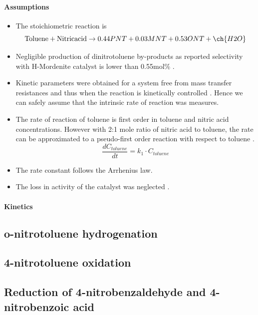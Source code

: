 \paragraph{Assumptions}
\begin{itemize}
    \item The stoichiometric reaction is 
    \begin{equation}
        \mathrm{Toluene} +  \mathrm{Nitric}  \mathrm{acid} \rightarrow 0.44PNT + 0.03 MNT + 0.53 ONT + \ch{H2O}
    \end{equation}
    \item Negligible production of dinitrotoluene by-products as reported selectivity with H-Mordenite catalyst is lower than 0.55mol\% \cite{jeeru_kinetics_2018}.
    \item Kinetic parameters were obtained for a system free from mass transfer resistances and thus when the reaction is kinetically controlled \cite{jeeru_kinetics_2018}. Hence we can safely assume that the intrinsic rate of reaction was measures.
    \item The rate of reaction of toluene is first order in toluene and nitric acid concentrations. However with 2:1 mole ratio of nitric acid to toluene, the rate can be approximated to a pseudo-first order reaction with respect to toluene \cite{jeeru_kinetics_2018}.
    \begin{equation}
    \frac{dC_{toluene}}{dt}=k_1 \cdot C_{toluene} 
    \end{equation}
    \item The rate constant follows the Arrhenius law.
    \item The loss in activity of the catalyst was neglected \cite{jeeru_kinetics_2018}.
\end{itemize}

\paragraph{Kinetics}



\subsection{o-nitrotoluene hydrogenation}

\subsection{4-nitrotoluene oxidation}

\subsection{Reduction of 4-nitrobenzaldehyde and 4-nitrobenzoic acid}
